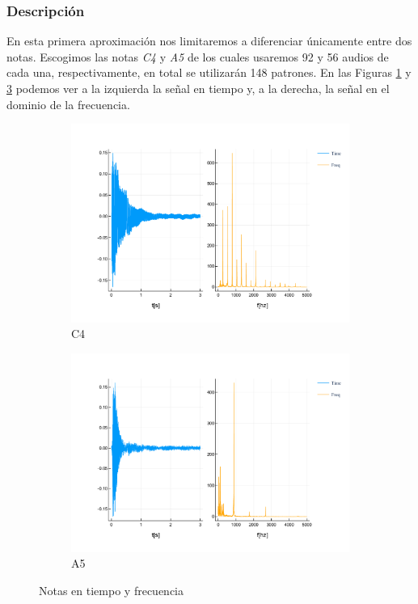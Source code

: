 \documentclass[12pt]{article}
\begin{document}
\subsubsection{Descripción}
En esta primera aproximación nos limitaremos a diferenciar únicamente entre dos notas. 
Escogimos las notas \textit{C4} y \textit{A5} de los cuales usaremos 92 y 56 audios de cada una, respectivamente, en total
se utilizarán 148 patrones. En las Figuras \ref{fig:c4} y \ref{fig:a5} podemos ver a la izquierda la señal en tiempo y, a la derecha,
la señal en el dominio de la frecuencia.

\begin{figure}[!ht]
	\centering
	\begin{subfigure}{.5\textwidth}
		\centering
		\includegraphics[width=1.0\linewidth]{assets/C4.pdf}
		\caption{C4}
		\label{fig:c4}
	\end{subfigure}%
	\begin{subfigure}{.5\textwidth}
		\centering
		\includegraphics[width=1.0\linewidth]{assets/A5.pdf}
		\caption{A5}
		\label{fig:a5}
	\end{subfigure}
	\caption{Notas en tiempo y frecuencia}
\end{figure}
\end{document}
